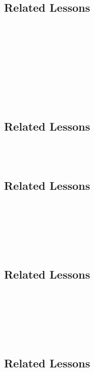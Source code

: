\subsection{Related Lessons}
\fourbFour{}\\
\fourbFive{}\\
\fourbSix{}\\
\fourbSeven{}\\
\fourbNine{}\\
\fourbEleven{}\\ 
\fourhFour{}\\
\fouriOne{}\\
%
\subsection{Related Lessons} 
\fourbThree{}\\
\fourFKThirtyThree{}\\
%
\subsection{Related Lessons}
\fourbThree{}\\
\fourFKThirtyThree{}\\
\fourhThree{}\\
\fourhFive{}\\
\fouriFive{}\\
%
\subsection{Related Lessons}
\fourbFour{}\\
\fourcOne{}\\
\fourdTwo{}\\
\fourdTwentyOne{}\\
\fourjTwo{}\\
%
\subsection{Related Lessons}
\fourbEleven{}\\
\fouriOne{}\\
\fouriFour{}\\
\fourjOne{}\\
\fourFKSeven{}\\
\fourFKEleven{}\\
\fourFKThirtyThree{}\\
